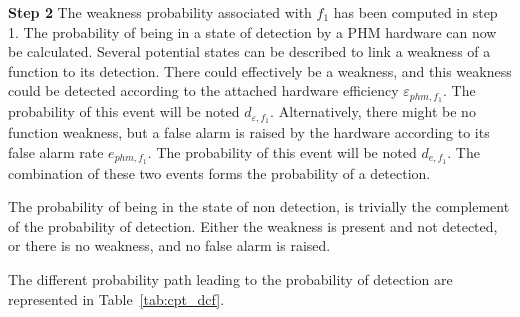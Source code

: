 \textbf{Step 2}\hspace{5pt}
The weakness probability associated with $f_1$ has been computed in step 1. The probability of being in a state of detection by a PHM hardware can now be calculated. Several potential states can be described to link a weakness of a function to its detection. There could effectively be a weakness, and this weakness could be detected according to the attached hardware efficiency $\varepsilon_{phm, f_1}$. The probability of this event will be noted $d_{\varepsilon, f_1}$. Alternatively, there might be no function weakness, but a false alarm is raised by the hardware according to its false alarm rate $e_{phm, f_1}$. The probability of this event will be noted $d_{e, f_1}$. The combination of these two events forms the probability of a detection.

The probability of being in the state of non detection, is trivially the complement of the probability of detection. Either the weakness is present and not detected, or there is no weakness, and no false alarm is raised.

The different probability path leading to the probability of detection are represented in Table~\ref{tab:cpt_dcf}.


